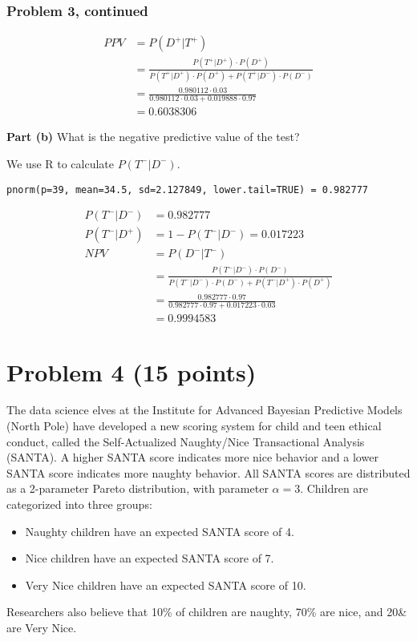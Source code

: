 \documentclass[12pt]{article}
\theoremstyle{definition}
\begin{document}
\subsubsection*{Problem 3, continued}
\begin{align*}
PPV &= P(D^+|T^+)\\
&= \frac{P(T^+|D^+) \cdot P(D^+)}{P(T^+|D^+) \cdot P(D^+) + P(T^+|D^-) \cdot P(D^-)}\\
&= \frac{0.980112 \cdot 0.03}{0.980112 \cdot 0.03 + 0.019888 \cdot 0.97}\\
&= 0.6038306
\end{align*}

\noindent
{\bf Part (b)} What is the negative predictive value of the test?

We use R to calculate $P(T^-|D^-)$.
\begin{verbatim}
pnorm(p=39, mean=34.5, sd=2.127849, lower.tail=TRUE) = 0.982777
\end{verbatim}
\begin{align*}
P(T^-|D^-) &= 0.982777\\
P(T^-|D^+) &= 1 - P(T^-|D^-) = 0.017223\\
NPV &= P(D^-|T^-)\\
&= \frac{P(T^-|D^-)\cdot P(D^-)}{P(T^-|D^-)\cdot P(D^-) + P(T^-|D^+)\cdot P(D^+)}\\
&= \frac{0.982777 \cdot 0.97}{0.982777 \cdot 0.97 + 0.017223 \cdot 0.03}\\
&= 0.9994583
\end{align*}







\newpage
\section*{Problem 4 (15 points)}

The data science elves at the Institute for Advanced Bayesian Predictive Models (North Pole) have developed a new scoring system for child and teen ethical conduct, called the Self-Actualized Naughty/Nice Transactional Analysis (SANTA). A higher SANTA score indicates more nice behavior and a lower SANTA score indicates more naughty behavior. All SANTA scores are distributed as a 2-parameter Pareto distribution, with parameter $\alpha = 3$. Children are categorized into three groups:
\begin{itemize}
	\item Naughty children have an expected SANTA score of 4.
	\item Nice children have an expected SANTA score of 7.
	\item Very Nice children have an expected SANTA score of 10.
\end{itemize}
Researchers also believe that 10\% of children are naughty, 70\% are nice, and 20\& are Very Nice.
\end{document}
